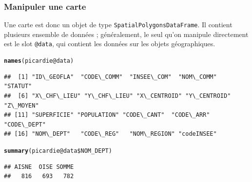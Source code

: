 \documentclass[slidetop, 10pt]{beamer}\usepackage{graphicx, color}
\makeatletter
\newcommand{\hlfunctioncall}[1]{\textcolor[rgb]{0.501960784313725,0,0.329411764705882}{\textbf{#1}}}%
\newenvironment{kframe}{%
 \def\at@end@of@kframe{}%
 \ifinner\ifhmode%
  \def\at@end@of@kframe{\end{minipage}}%
  \begin{minipage}{\columnwidth}%
 \fi\fi%
 \def\FrameCommand##1{\hskip\@totalleftmargin \hskip-\fboxsep
 \colorbox{shadecolor}{##1}\hskip-\fboxsep
     \hskip-\linewidth \hskip-\@totalleftmargin \hskip\columnwidth}%
 \MakeFramed {\advance\hsize-\width
   \@totalleftmargin\z@ \linewidth\hsize
   \@setminipage}}%
 {\par\unskip\endMakeFramed%
 \at@end@of@kframe}
\newenvironment{knitrout}{}{} %
\renewenvironment{knitrout}{\begin{tiny}}{\end{tiny}}
\makeatother
\begin{document}
\begin{frame}[fragile]
\frametitle{Manipuler une carte}

Une carte est donc un objet de type \verb!SpatialPolygonsDataFrame!. Il contient plusieurs ensemble de données ; généralement, le seul qu'on manipule directement est le slot \verb!@data!, qui contient les données sur les objets géographiques. 

\begin{knitrout}\tiny
{}\color{fgcolor}\begin{kframe}
\begin{alltt}
\hlfunctioncall{names}(picardie@data)
\end{alltt}
\begin{verbatim}
##  [1] "ID\_GEOFLA"  "CODE\_COMM"  "INSEE\_COM"  "NOM\_COMM"   "STATUT"    
##  [6] "X\_CHF\_LIEU" "Y\_CHF\_LIEU" "X\_CENTROID" "Y\_CENTROID" "Z\_MOYEN"   
## [11] "SUPERFICIE" "POPULATION" "CODE\_CANT"  "CODE\_ARR"   "CODE\_DEPT" 
## [16] "NOM\_DEPT"   "CODE\_REG"   "NOM\_REGION" "codeINSEE"
\end{verbatim}
\begin{alltt}
\hlfunctioncall{summary}(picardie@data\$NOM\_DEPT)
\end{alltt}
\begin{verbatim}
## AISNE  OISE SOMME 
##   816   693   782
\end{verbatim}
\end{kframe}
\end{knitrout}

\end{frame}
\end{document}
